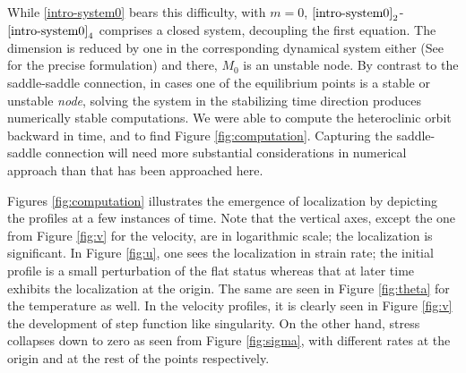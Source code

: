 \documentclass[a4paper,11pt]{article}
\theoremstyle{remark}
\begin{document}
While \eqref{intro-system0} bears this difficulty, with $m=0$, $\eqref{intro-system0}_2$-$\eqref{intro-system0}_4$ comprises a closed system, decoupling the first equation. The dimension is reduced by one in the corresponding dynamical system either (See \cite{KLT_HYP2016} for the precise formulation) and there, $M_0$ is an unstable node. By contrast to the saddle-saddle connection, in cases one of the equilibrium points is a stable or unstable {\it node}, solving the system in the stabilizing time direction produces numerically stable computations. We were able to compute the heteroclinic orbit backward in time, and to find Figure \ref{fig:computation}. Capturing the saddle-saddle connection will need more substantial considerations in numerical approach than that has been approached here.


Figures \ref{fig:computation} illustrates the emergence of localization by depicting the profiles at a few instances of time. Note that the vertical axes, except the one from Figure \ref{fig:v} for the velocity, are in logarithmic scale; the localization is significant. In Figure \ref{fig:u}, one sees the localization in strain rate; the initial profile is a small perturbation of the flat status whereas that at later time exhibits the localization at the origin. The same are seen in Figure \ref{fig:theta} %
for the temperature as well. In the velocity profiles, it is clearly seen in Figure \ref{fig:v} the development of step function like singularity. On the other hand, stress collapses down to zero as seen from Figure \ref{fig:sigma}, with different rates at the origin and at the rest of the points respectively.
\end{document}
